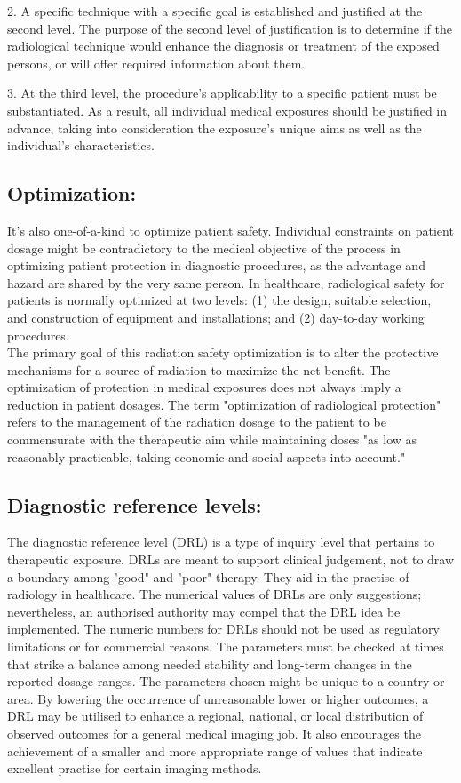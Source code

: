 \documentclass{article}
\begin{document}
2.	A specific technique with a specific goal is established and justified at the second level. The purpose of the second level of justification is to determine if the radiological technique would enhance the diagnosis or treatment of the exposed persons, or will offer required information about them.

3.	At the third level, the procedure's applicability to a specific patient must be substantiated. As a result, all individual medical exposures should be justified in advance, taking into consideration the exposure's unique aims as well as the individual's characteristics.

\subsection{Optimization:}
\large
It's also one-of-a-kind to optimize patient safety. Individual constraints on patient dosage might be contradictory to the medical objective of the process in optimizing patient protection in diagnostic procedures, as the advantage and hazard are shared by the very same person. In healthcare, radiological safety for patients is normally optimized at two levels:
(1) the design, suitable selection, and construction of equipment and installations; and (2) day-to-day working procedures. \\

The primary goal of this radiation safety optimization is to alter the protective mechanisms for a source of radiation to maximize the net benefit. The optimization of protection in medical exposures does not always imply a reduction in patient dosages. The term "optimization of radiological protection" refers to the management of the radiation dosage to the patient to be commensurate with the therapeutic aim while maintaining doses "as low as reasonably practicable, taking economic and social aspects into account."

\subsection{Diagnostic reference levels:}

The diagnostic reference level (DRL) is a type of inquiry level that pertains to therapeutic exposure. DRLs are meant to support clinical judgement, not to draw a boundary among "good" and "poor" therapy. They aid in the practise of radiology in healthcare. The numerical values of DRLs are only suggestions; nevertheless, an authorised authority may compel that the DRL idea be implemented. The numeric numbers for DRLs should not be used as regulatory limitations or for commercial reasons. The parameters must be checked at times that strike a balance among needed stability and long-term changes in the reported dosage ranges. The parameters chosen might be unique to a country or area. By lowering the occurrence of unreasonable lower or higher outcomes, a DRL may be utilised to enhance a regional, national, or local distribution of observed outcomes for a general medical imaging job. It also encourages the achievement of a smaller and more appropriate range of values that indicate excellent practise for certain imaging methods. \\
\end{document}
